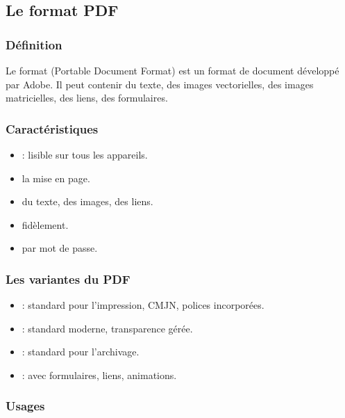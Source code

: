 \subsection{Le format PDF}

\subsubsection{Définition}

Le format  (Portable Document Format) est un format de document développé par Adobe. Il peut contenir du texte, des images vectorielles, des images matricielles, des liens, des formulaires.

\subsubsection{Caractéristiques}

\begin{itemize}
    \item {} : lisible sur tous les appareils.
    \item {} la mise en page.
    \item {} du texte, des images, des liens.
    \item {} fidèlement.
    \item {} par mot de passe.
\end{itemize}

\subsubsection{Les variantes du PDF}

\begin{itemize}
    \item {} : standard pour l'impression, CMJN, polices incorporées.
    \item {} : standard moderne, transparence gérée.
    \item {} : standard pour l'archivage.
    \item {} : avec formulaires, liens, animations.
\end{itemize}

\subsubsection{Usages}

